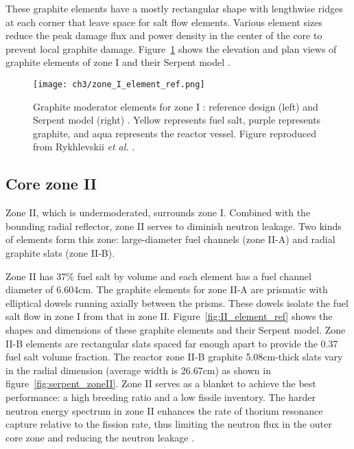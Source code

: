 These graphite elements have a mostly rectangular shape with lengthwise ridges 
at each corner that leave space for salt flow elements. Various element sizes 
reduce the peak damage flux and power density in the center of the core to 
prevent local graphite damage.  Figure~\ref{fig:I_element_ref} shows the 
elevation and plan views of graphite elements of zone I 
\cite{robertson_conceptual_1971} and their Serpent model 
\cite{rykhlevskii_full-core_2017}.
\begin{figure}[ht!] %
	\texttt{[image: ch3/zone\_I\_element\_ref.png]}
	\caption{Graphite moderator elements for zone I : reference design (left)
		\cite{robertson_conceptual_1971} and Serpent model (right) 
		\cite{rykhlevskii_full-core_2017}.  Yellow 
		represents fuel salt, purple represents graphite, and aqua represents 
		the reactor vessel. Figure reproduced from Rykhlevskii \emph{et al.} 
		\cite{rykhlevskii_modeling_2019}.}
	\label{fig:I_element_ref}
\end{figure}

\subsection{Core zone II}
Zone II, which is undermoderated, surrounds zone I. Combined with the bounding 
radial reflector, zone II serves to diminish neutron leakage. Two kinds of 
elements form this zone: large-diameter fuel channels (zone II-A) and 
radial graphite slats (zone II-B). 

Zone II has 37\% fuel salt by volume and each element has a fuel channel 
diameter of 6.604cm. The graphite elements for zone II-A are prismatic with
elliptical dowels running axially between the prisms. These dowels
isolate the fuel salt flow in zone I from that in zone II.  
Figure~\ref{fig:II_element_ref} shows the shapes and dimensions of these 
graphite elements and their Serpent model. Zone II-B elements are rectangular 
slats spaced far enough apart to provide the 0.37 fuel salt volume fraction. 
The reactor zone II-B graphite 5.08cm-thick slats vary in the radial dimension 
(average width is 26.67cm) as shown in figure~\ref{fig:serpent_zoneII}. Zone 
II serves as a blanket to achieve the best performance: a high breeding ratio 
and a low fissile inventory. The harder neutron energy spectrum in zone II 
enhances the rate of thorium resonance capture relative to the fission rate, 
thus limiting the neutron flux in the outer core zone and reducing the neutron 
leakage \cite{robertson_conceptual_1971}. 

